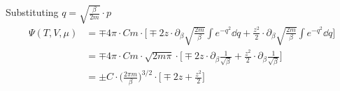     Substituting $q=\sqrt{\frac{\beta}{2m}}\cdot p$
    \begin{align}
        \Psi(T,V,\mu)
        &=\mp 4\pi\cdot Cm\cdot\bigg[
            \mp2z\cdot\partial_\beta
                \sqrt{\frac{2m}{\beta}}
                \int e^{-q^2} \dd q
            +\frac{z^2}{2}\cdot\partial_\beta
                \sqrt{\frac{2m}{\beta}}
                \int e^{-q^2} \dd q
        \bigg] \\
        &=\mp 4\pi\cdot Cm\cdot\sqrt{2m\pi}\cdot\bigg[
            \mp2z\cdot\partial_\beta
                \frac{1}{\sqrt{\beta}}
            +\frac{z^2}{2}\cdot\partial_\beta
                \frac{1}{\sqrt{\beta}}
        \bigg] \\
            &=\pm C\cdot
            \bigg( \frac{2\pi m}{\beta} \bigg)^{3/2}\cdot
        \bigg[
            \mp2z
            +\frac{z^2}{2}
        \bigg] \\
    \end{align}

\newpage

